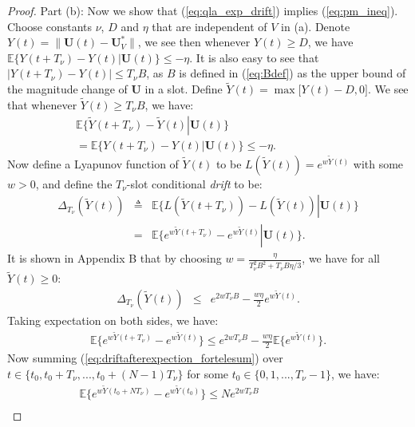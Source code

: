 \documentclass[journal]{IEEEtran}
\newcommand{\expect}[1]{\mathbb{E}\big\{#1\big\}}
\newcommand{\bv}[1]{{\boldsymbol{#1} }}
\begin{document}
\begin{proof}
 
Part (b): Now we show that (\ref{eq:qla_exp_drift}) implies (\ref{eq:pm_ineq}). Choose constants $\nu$, $D$ and $\eta$ that are independent of $V$ in (a). Denote $Y(t)=\|\bv{U}(t)-\bv{U}^*_V\|$, we see then whenever $Y(t)\geq D$, we have $\expect{Y(t+T_{\nu})-Y(t)\left|\right.\bv{U}(t)}\leq -\eta$. It is also easy to see that $|Y(t+T_{\nu})-Y(t)|\leq T_{\nu}B$, as $B$ is defined in (\ref{eq:Bdef}) as the upper bound of the magnitude change of $\bv{U}$ in a slot. Define $\tilde{Y}(t)=\max\big[Y(t)-D, 0\big]$. We see that whenever $\tilde{Y}(t)\geq T_{\nu}B$, we have:
\begin{eqnarray}
\expect{\tilde{Y}(t+T_{\nu})-\tilde{Y}(t)\left|\right. \bv{U}(t)}\label{eq:Ytilde_sameasY}\qquad\qquad\qquad\qquad\qquad\\
=\expect{Y(t+T_{\nu})-Y(t)\left|\right. \bv{U}(t)}\leq -\eta.\nonumber
\end{eqnarray}
Now define a Lyapunov function of $\tilde{Y}(t)$ to be $L(\tilde{Y}(t))=e^{w\tilde{Y}(t)}$ with some $w>0$, and define the $T_{\nu}$-slot conditional \emph{drift} to be: 
\begin{eqnarray}
\Delta_{T_{\nu}}(\tilde{Y}(t))&\triangleq&\expect{L(\tilde{Y}(t+T_{\nu}))-L(\tilde{Y}(t))\left|\right. \bv{U}(t)}\nonumber\\
&=&\expect{e^{w\tilde{Y}(t+T_{\nu})}-e^{w\tilde{Y}(t)}\left|\right.\bv{U}(t)}.\label{eq:drift_exp_tildeY}
\end{eqnarray}
It is shown in Appendix B that by choosing $w=\frac{\eta}{T^2_{\nu}B^2+T_{\nu}B\eta/3}$, we have for all $\tilde{Y}(t)\geq0$:
\begin{eqnarray}
\Delta_{T_{\nu}}(\tilde{Y}(t)) &\leq&e^{2wT_{\nu}B}-\frac{w\eta}{2}e^{w\tilde{Y}(t)}. \label{eq:drift_tildeY_combine}
\end{eqnarray}
Taking expectation on both sides, we have:
\begin{eqnarray}
\expect{e^{w\tilde{Y}(t+T_{\nu})}-e^{w\tilde{Y}(t)}}\leq e^{2wT_{\nu}B}-\frac{w\eta}{2}\expect{e^{w\tilde{Y}(t)}}. \label{eq:driftafterexpection_fortelesum}
\end{eqnarray}
Now summing (\ref{eq:driftafterexpection_fortelesum}) over $t\in\{t_0, t_0+T_{\nu}, ..., t_0+(N-1)T_{\nu}\}$ for some $t_0\in\{0, 1, ..., T_{\nu}-1\}$, we have:
\begin{eqnarray*}
\expect{e^{w\tilde{Y}(t_0+NT_{\nu})}-e^{w\tilde{Y}(t_0)}}\leq Ne^{2wT_{\nu}B}\label{eq:Tslotdrift_sumoverj}\qquad\qquad\qquad\quad\\

\end{eqnarray*}
\end{proof}
\end{document}
